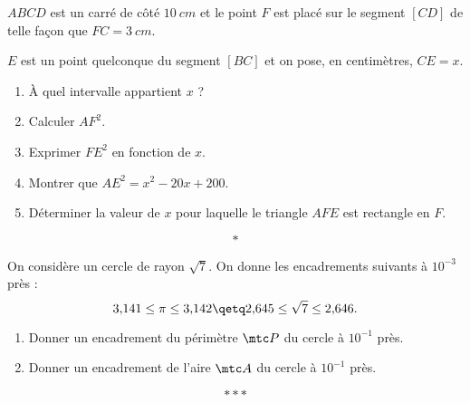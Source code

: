 \documentclass[10pt,openright,twoside,french]{book}
\begin{document}
\exo
$ABCD$ est un carré de côté $10~cm$ et le point $F$ est placé sur le segment $[CD]$ de telle façon que $FC = 3~cm$.\par
$E$ est un point quelconque du segment $[BC]$ et on pose, en centimètres, $CE = x$.

\begin{center}
\end{center}

\begin{enumerate}
    \item À quel intervalle appartient $x$ ?
    \item Calculer $AF^2$.
    \item Exprimer $FE^2$ en fonction de $x$.
    \item Montrer que $AE^2 = x^2 - 20x + 200$.
    \item Déterminer la valeur de $x$ pour laquelle le triangle $AFE$ est rectangle en $F$.
\end{enumerate}\[*\]

\exo
On considère un cercle de rayon $\sqrt 7$. On donne les encadrements suivants à $10^{-3}$ près :
\[3{,}141 \leq \pi \leq 3{,}142 \qetq 2{,}645 \leq \sqrt7 \leq 2{,}646.\]
\begin{enumerate}
    \item Donner un encadrement du périmètre $\mtc P$ du cercle à $10^{-1}$ près.
    \item Donner un encadrement de l'aire $\mtc A$ du cercle à $10^{-1}$ près.
\end{enumerate}\[***\]
\end{document}
